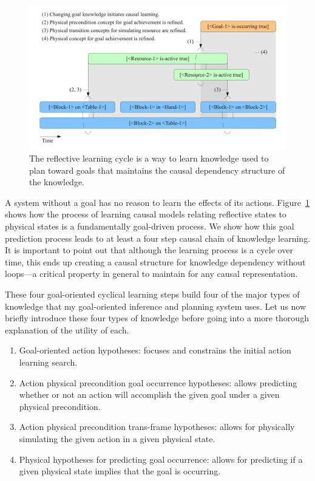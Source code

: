 \begin{figure}[bth]
  \center
  \includegraphics[width=12cm]{gfx/learning_to_plan}
  \caption[The reflective learning cycle]{The reflective learning
    cycle is a way to learn knowledge used to plan toward goals that
    maintains the causal dependency structure of the knowledge.}
  \label{fig:learning_to_plan}
\end{figure}

A system without a goal has no reason to learn the effects of its
actions.  Figure~\ref{fig:learning_to_plan} shows how the process of
learning causal models relating reflective states to physical states
is a fundamentally goal-driven process.  We show how this goal
prediction process leads to at least a four step causal chain of
knowledge learning.  It is important to point out that although the
learning process is a cycle over time, this ends up creating a causal
structure for knowledge dependency without loops---a critical property
in general to maintain for any causal representation.

These four goal-oriented cyclical learning steps build four of the
major types of knowledge that my goal-oriented inference and planning
system uses.  Let us now briefly introduce these four types of
knowledge before going into a more thorough explanation of the utility
of each.

\begin{enumerate}

\item{Goal-oriented action hypotheses: focuses and constrains the
  initial action learning search.}

\item{Action physical precondition goal occurrence hypotheses: allows
  predicting whether or not an action will accomplish the given goal
  under a given physical precondition.}

\item{Action physical precondition trans-frame hypotheses: allows for
  physically simulating the given action in a given physical state.}

\item{Physical hypotheses for predicting goal occurrence: allows for
  predicting if a given physical state implies that the goal is
  occurring.}

\end{enumerate}


